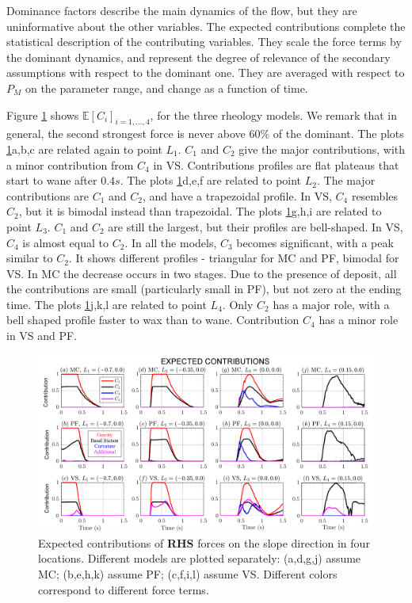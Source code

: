 \documentclass{article}
\begin{document}
Dominance factors describe the main dynamics of the flow, but they are uninformative about the other variables. The expected contributions complete the statistical description of the contributing variables. They scale the force terms by the dominant dynamics, and represent the degree of relevance of the secondary assumptions with respect to the dominant one. They are averaged with respect to $P_M$ on the parameter range, and change as a function of time.

Figure \ref{fig:Ramp-Ci_x} shows $\mathbb E[C_i]_{i=1,\dots,4}$, for the three rheology models. We remark that in general, the second strongest force is never above 60\% of the dominant. The plots \ref{fig:Ramp-Ci_x}a,b,c are related again to point $L_1$. $C_1$ and $C_2$ give the major contributions, with a minor contribution from $C_4$ in VS. Contributions profiles are flat plateaus that start to wane after $0.4 s$. The plots \ref{fig:Ramp-Ci_x}d,e,f are related to point $L_2$. The major contributions are $C_1$ and $C_2$, and have a trapezoidal profile. In VS, $C_4$ resembles $C_2$, but it is bimodal instead than trapezoidal. The plots \ref{fig:Ramp-Ci_x}g,h,i are related to point $L_3$. $C_1$ and $C_2$ are still the largest, but their profiles are bell-shaped. In VS, $C_4$ is almost equal to $C_2$. In all the models, $C_3$ becomes significant, with a peak similar to $C_2$. It shows different profiles - triangular for MC and PF, bimodal for VS. In MC the decrease occurs in two stages. Due to the presence of deposit, all the contributions are small (particularly small in PF), but not zero at the ending time. The plots \ref{fig:Ramp-Ci_x}j,k,l are related to point $L_4$. Only $C_2$ has a major role, with a bell shaped profile faster to wax than to wane. Contribution $C_4$ has a minor role in VS and PF.
\begin{figure}[H]
         \centering
        \includegraphics[width=1\textwidth]{figures/incline/Ci_x.png}
        \caption{Expected contributions of \textbf{RHS} forces on the slope direction in four locations. Different models are plotted separately: (a,d,g,j) assume MC; (b,e,h,k) assume PF; (c,f,i,l) assume VS. Different colors correspond to different force terms.}
        \label{fig:Ramp-Ci_x}
\end{figure}
\end{document}
